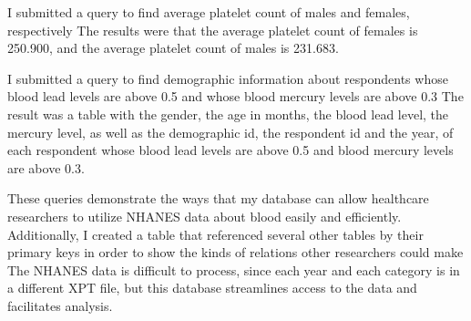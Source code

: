 \documentclass[]{article}
\begin{document}
I submitted a query to find average platelet count of males and females, respectively
The results were that the average platelet count of females is 250.900, and the average platelet count of males is 231.683. 

I submitted a query to find demographic information about respondents whose blood lead levels are above 0.5 and whose blood mercury levels are above 0.3
The result was a table with the gender, the age in months, the blood lead level, the mercury level, as well as the demographic id, the respondent id and the year, of each respondent whose blood lead levels are above 0.5 and blood mercury levels are above 0.3. 

These queries demonstrate the ways that my database can allow healthcare researchers to utilize NHANES data about blood easily and efficiently. Additionally, I created a table that referenced several other tables by their primary keys in order to show the kinds of relations other researchers could make The NHANES data is difficult to process, since each year and each category is in a different XPT file, but this database streamlines access to the data and facilitates analysis. 
\end{document}
